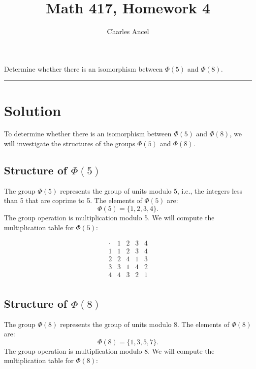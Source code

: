 \documentclass[12pt]{amsart}
\title{Math 417, Homework 4}
\author{Charles Ancel}
\theoremstyle{definition}
\numberwithin{equation}{section}
\begin{document}
\maketitle

\begin{exercise}{1} Determine whether there is an isomorphism between \(\Phi(5)\) and \(\Phi(8)\).

    \noindent\rule{\linewidth}{1pt}
    
    \section*{Solution}
    
    To determine whether there is an isomorphism between \(\Phi(5)\) and \(\Phi(8)\), we will investigate the structures of the groups \(\Phi(5)\) and \(\Phi(8)\).
    
    \subsection*{Structure of \(\Phi(5)\)}
    
    The group \(\Phi(5)\) represents the group of units modulo 5, i.e., the integers less than 5 that are coprime to 5. The elements of \(\Phi(5)\) are:
    \[
    \Phi(5) = \{1, 2, 3, 4\}.
    \]
    The group operation is multiplication modulo 5. We will compute the multiplication table for \(\Phi(5)\):
    
    \[
    \begin{array}{c|cccc}
      \cdot & 1 & 2 & 3 & 4 \\
      \hline
      1 & 1 & 2 & 3 & 4 \\
      2 & 2 & 4 & 1 & 3 \\
      3 & 3 & 1 & 4 & 2 \\
      4 & 4 & 3 & 2 & 1 \\
    \end{array}
    \]
    
    \subsection*{Structure of \(\Phi(8)\)}
    
    The group \(\Phi(8)\) represents the group of units modulo 8. The elements of \(\Phi(8)\) are:
    \[
    \Phi(8) = \{1, 3, 5, 7\}.
    \]
    The group operation is multiplication modulo 8. We will compute the multiplication table for \(\Phi(8)\):
    

\end{exercise}
\end{document}
